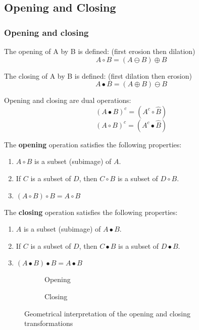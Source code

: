 \subsection{Opening and Closing}
\subsubsection{Opening and closing}
The opening of A by B is defined: (first erosion then dilation)
\[
	A \circ B = (A \ominus B) \oplus B
\]

The closing of A by B is defined: (first dilation then erosion)
\[
	A  \bullet B = (A \oplus B) \ominus B
\]

Opening and closing are dual operations: 
\[
	(A  \bullet B)^c = (A^c \circ \hat{B})
\]
\[
	(A \circ B)^c = (A^c \bullet \hat{B})
\]

The \textbf{opening} operation satisfies the following properties:
\begin{enumerate}[label=\textbf{(\alph*)}]
	\item $A \circ B$ is a subset (subimage) of $A$.
	\item If $C$ is a subset of $D$, then $C \circ B$ is a subset of $D \circ B$.
	\item $(A \circ B) \circ B = A \circ B$
\end{enumerate}

The \textbf{closing} operation satisfies the following properties:
\begin{enumerate}[label=\textbf{(\alph*)}]
	\item $A$ is a subset (subimage) of $A \bullet B$.
	\item If $C$ is a subset of $D$, then $C \bullet B$ is a subset of $D \bullet B$.
	\item $(A \bullet B) \bullet B = A \bullet B$
\end{enumerate}

\begin{figure}[h!]
	\centering
	\begin{subfigure}[b]{0.45\textwidth}
		\centering
		\caption{Opening}
	\end{subfigure}
	\begin{subfigure}[b]{0.45\textwidth}
		\centering
		\caption{Closing}
	\end{subfigure}
	\caption{Geometrical interpretation of the opening and closing transformations}
\end{figure}


